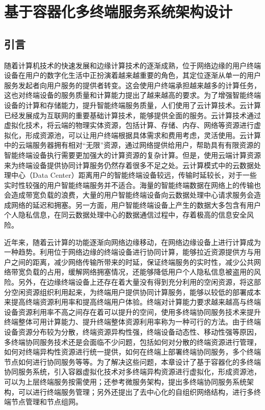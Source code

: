 \chapter{基于容器化多终端服务系统架构设计 }\label{chap:service_system}

\section{引言}
随着计算机技术的快速发展和边缘计算技术的逐渐成熟，位于网络边缘的用户终端设备在用户的数字化生活中正扮演着越来越重要的角色，其定位逐渐从单一的用户服务发起者向用户服务的提供者转变。这会使用户终端承担越来越多的计算任务，这也对终端设备的服务质量和计算能力提出了越来越高的要求。为了增强智能终端设备的计算和存储能力，提升智能终端服务质量，人们使用了云计算技术\cite{ma2013mobile,qi2012research,othman2014survey,liu2013gearing}。云计算已经发展成为互联网的重要基础计算技术，能够提供全面的服务\cite{luan2015fog}。云计算技术通过虚拟化技术，将云端的物理实体资源，包括计算、存储、内存、网络等资源进行虚拟化，形成资源池，可以让用户终端根据具体需求和费用考虑，灵活使用。云计算中的云端服务器拥有相对“无限”资源，通过网络提供给用户，帮助具有有限资源的智能终端设备执行需要更加强大的计算资源的复杂计算\citep{Noor.2018}。但是，使用云端计算资源来为终端设备提供协同计算服务仍然存着很多不足之处。云计算模式中的云数据处理中心（Data Center）距离用户的智能终端设备较远，传输时延较长，对于一些实时性较强的用户智能终端服务并不适合。海量的智能终端数据在网络上的传输也会造成带宽负载的浪费，大量的用户智能终端设备向云数据处理中心请求服务会造成网络的延迟和拥塞\citep{mao2016dynamic,ismail2015evaluation}。另一方面，用户智能终端设备上产生的数据大多包含有用户个人隐私信息，在同云数据处理中心的数据通信过程中，存着极高的信息安全风险\cite{sun2016edgeiot}。

近年来，随着云计算的功能逐渐向网络边缘移动，在网络边缘设备上进行计算成为一种趋势\cite{mao2017survey}。利用位于网络边缘的终端设备进行协同计算，能够拉近资源提供方与用户之间的距离，减少网络传输所带来的时延，保证终端服务的实时性，减少公共网络带宽负载的占用，缓解网络拥塞情况，还能够降低用户个人隐私信息被盗用的风险。另外，在边缘终端设备上还存在着大量没有得到充分利用的空闲资源，将这部分空闲资源组织利用起来，为终端用户提供协同计算服务，能够以较低的部署成本来提高终端资源利用率和提高终端用户体验。终端对计算能力要求越来越高与终端设备资源利用率不高之间存在着可以提升的空间，使用多终端协同服务技术来提升终端整体可用计算能力、提升终端整体资源利用率称为一种可行的方法。由于终端设备资源分布较为分散，终端资源异构性强，终端设备动态性、移动性强等原因，多终端协同服务技术还是会面临不少问题，包括如何对分散的终端资源进行管理，如何对终端异构性资源进行统一提供，如何在终端上部署终端协同服务，多个终端节点如何进行协同服务等等。为了解决这些问题，本章设计了基于容器化的多终端协同服务系统，引入容器虚拟化技术对多终端异构资源进行虚拟化，形成资源池，可以为上层终端服务按需使用；还参考微服务架构，提出多终端协同服务系统架构，可以进行终端服务管理；另外还提出了去中心化的自组织网络结构，进行多终端节点管理和节点组网。

